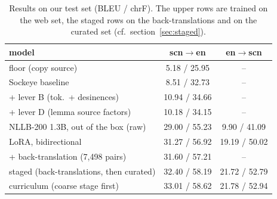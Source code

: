 \begin{table}[t]
\caption{Results on our test set (BLEU / chrF). The upper rows are trained on the web set, the
staged rows on the back-translations and on the curated set (cf.\ section~\ref{sec:staged}).}
\label{tab:results}
\centering
\begin{tabular}{lcc}
\toprule
model & scn$\rightarrow$en & en$\rightarrow$scn \\
\midrule
floor (copy source) & 5.18 / 25.95 & -- \\
Sockeye baseline & 8.51 / 32.73 & -- \\
\;+ lever B (tok.\ + desinences) & 10.94 / 34.66 & -- \\
\;+ lever D (lemma source factors) & 10.18 / 34.15 & -- \\
\midrule
NLLB-200 1.3B, out of the box (raw) & 29.00 / 55.23 & 9.90 / 41.09 \\
LoRA, bidirectional & 31.27 / 56.92 & 19.19 / 50.02 \\
\;+ back-translation (7{,}498 pairs) & 31.60 / 57.21 & -- \\
\midrule
staged (back-translations, then curated) & 32.40 / 58.19 & 21.72 / 52.79 \\
curriculum (coarse stage first) & 33.01 / 58.62 & 21.78 / 52.94 \\
\bottomrule
\end{tabular}
\end{table}
